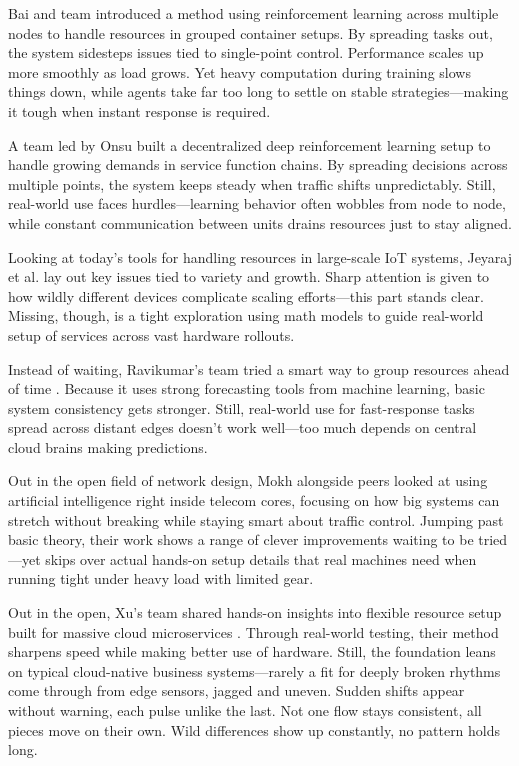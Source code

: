 \documentclass[a4paper,fleqn]{cas-dc}
\numberwithin{equation}{section}
\begin{document}
Bai and team \cite{Bai2024DRPC} introduced a method using reinforcement learning across multiple nodes to handle resources in grouped container setups. By spreading tasks out, the system sidesteps issues tied to single-point control. Performance scales up more smoothly as load grows. Yet heavy computation during training slows things down, while agents take far too long to settle on stable strategies—making it tough when instant response is required.

A team led by Onsu \cite{Onsu2024Scalability} built a decentralized deep reinforcement learning setup to handle growing demands in service function chains. By spreading decisions across multiple points, the system keeps steady when traffic shifts unpredictably. Still, real-world use faces hurdles—learning behavior often wobbles from node to node, while constant communication between units drains resources just to stay aligned.

Looking at today's tools for handling resources in large-scale IoT systems, Jeyaraj et al. \cite{Jeyaraj2023Resource} lay out key issues tied to variety and growth. Sharp attention is given to how wildly different devices complicate scaling efforts—this part stands clear. Missing, though, is a tight exploration using math models to guide real-world setup of services across vast hardware rollouts.

Instead of waiting, Ravikumar's team tried a smart way to group resources ahead of time \cite{Ravikumar2024Intelligent}. Because it uses strong forecasting tools from machine learning, basic system consistency gets stronger. Still, real-world use for fast-response tasks spread across distant edges doesn't work well—too much depends on central cloud brains making predictions.

Out in the open field of network design, Mokh alongside peers \cite{Mokh2024LargeScaleAI} looked at using artificial intelligence right inside telecom cores, focusing on how big systems can stretch without breaking while staying smart about traffic control. Jumping past basic theory, their work shows a range of clever improvements waiting to be tried—yet skips over actual hands-on setup details that real machines need when running tight under heavy load with limited gear.

Out in the open, Xu's team shared hands-on insights into flexible resource setup built for massive cloud microservices \cite{Xu2023Practice}. Through real-world testing, their method sharpens speed while making better use of hardware. Still, the foundation leans on typical cloud-native business systems—rarely a fit for deeply broken rhythms come through from edge sensors, jagged and uneven. Sudden shifts appear without warning, each pulse unlike the last. Not one flow stays consistent, all pieces move on their own. Wild differences show up constantly, no pattern holds long.
\end{document}
